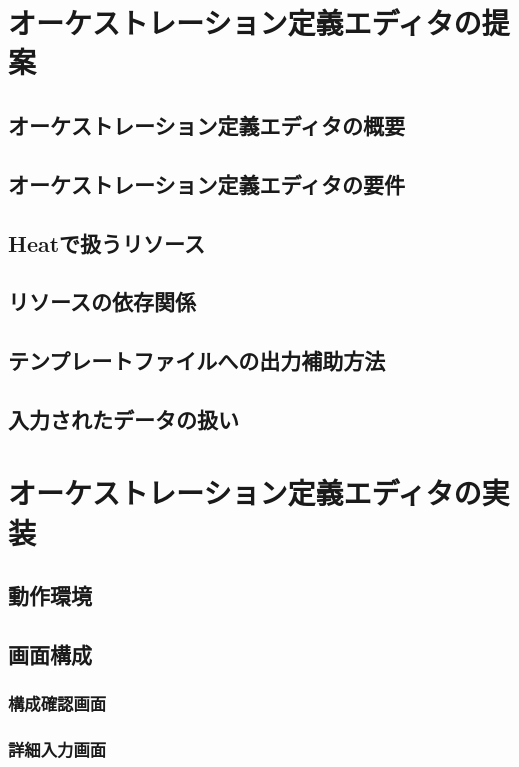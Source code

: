 \documentclass[mingoth]{kut-paper}		%
\begin{document}
	
\chapter{オーケストレーション定義エディタの提案}
%
	\section{オーケストレーション定義エディタの概要}
	
	\section{オーケストレーション定義エディタの要件}
	
	\section{Heatで扱うリソース}
	
	\section{リソースの依存関係}
	
	\section{テンプレートファイルへの出力補助方法}
	
	\section{入力されたデータの扱い}
	
	
\chapter{オーケストレーション定義エディタの実装}
	\section{動作環境}
	
	\section{画面構成}
	
		\subsection{構成確認画面}
		
		\subsection{詳細入力画面}
	
\end{document}
